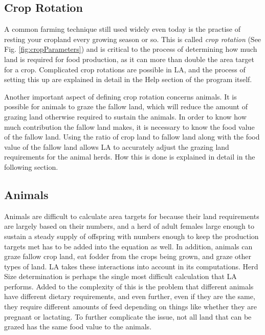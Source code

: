   \subsection{Crop Rotation}
  \label{cropRotation}
    A common farming technique still used widely even today is the practise of
    resting your cropland every growing season or so.  This is called
    \textit{crop rotation} (See Fig.  \ref{fig:cropParameters}) and is critical
    to the process of determining how much land is required for food production,
    as it can more than double the area target for a crop.  Complicated crop 
    rotations are possible in LA, and the process of setting this up are explained
    in detail in the Help section of the program itself.
  
    Another important aspect of defining crop rotation concerns animals.  It is
    possible for animals to graze the fallow land, which will reduce the amount
    of grazing land otherwise required to sustain the animals.  In order to
    know how much contribution the fallow land makes, it is necessary to know
    the food value of the fallow land.  Using the ratio of crop land to fallow
    land along with the food value of the fallow land allows LA to
    accurately adjust the grazing land requirements for the animal herds.  How
    this is done is explained in detail in the following section.

  \subsection{Animals}
    Animals are difficult to calculate area targets for because their land
    requirements are largely based on their numbers, and a herd of adult
    females large enough to sustain a steady supply of offspring with numbers
    enough to keep the production targets met has to be added into the equation as
    well.  In addition, animals can graze fallow crop land, eat fodder from
    the crops being grown, and graze other types of land.  LA takes these
    interactions into account in its computations.
    Herd Size determination is perhaps the single most difficult calculation that
    LA performs.  Added to the complexity of this is the problem that different
    animals have different dietary requirements, and even further, even if they
    are the same, they require different amounts of feed depending on things like
    whether they are pregnant or lactating.  To further complicate the issue, not
    all land that can be grazed has the same food value to the animals.
    
